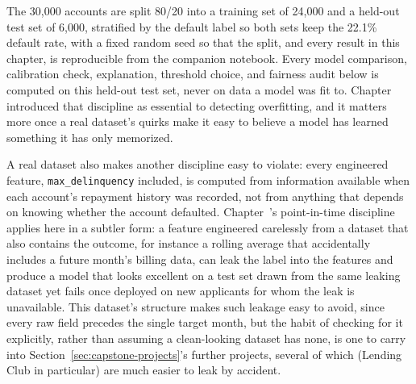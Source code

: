 \documentclass[../ai_in_finance]{subfiles}
\begin{document}
The 30,000 accounts are split 80/20 into a training set of 24,000 and a held-out test set of 6,000, stratified by the default label so both sets keep the 22.1\% default rate, with a fixed random seed so that the split, and every result in this chapter, is reproducible from the companion notebook. Every model comparison, calibration check, explanation, threshold choice, and fairness audit below is computed on this held-out test set, never on data a model was fit to. Chapter~ introduced that discipline as essential to detecting overfitting, and it matters more once a real dataset's quirks make it easy to believe a model has learned something it has only memorized.

A real dataset also makes another discipline easy to violate: every engineered feature, \texttt{max\_\allowbreak delinquency} included, is computed from information available when each account's repayment history was recorded, not from anything that depends on knowing whether the account defaulted. Chapter~'s point-in-time discipline applies here in a subtler form: a feature engineered carelessly from a dataset that also contains the outcome, for instance a rolling average that accidentally includes a future month's billing data, can leak the label into the features and produce a model that looks excellent on a test set drawn from the same leaking dataset yet fails once deployed on new applicants for whom the leak is unavailable. This dataset's structure makes such leakage easy to avoid, since every raw field precedes the single target month, but the habit of checking for it explicitly, rather than assuming a clean-looking dataset has none, is one to carry into Section~\ref{sec:capstone-projects}'s further projects, several of which (Lending Club in particular) are much easier to leak by accident.
\end{document}
